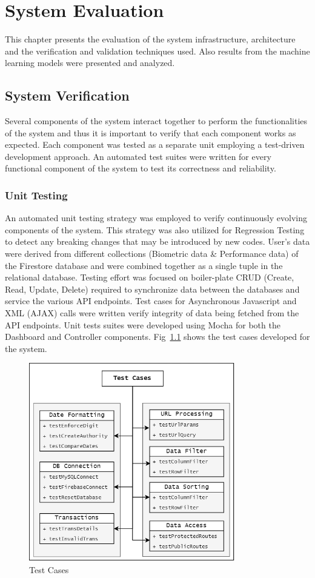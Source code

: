 \chapter{System Evaluation}
This chapter presents the evaluation of the system infrastructure, architecture and the verification and validation techniques used. Also results from the machine 
learning models were presented and analyzed. 


\section{System Verification}
Several components of the system interact together to perform the functionalities of the system and thus it is important to verify that each component works as 
expected. Each component was tested as a separate unit employing a test-driven development approach. An automated test suites were written for every functional component
of the system to test its correctness and reliability.
\subsection{Unit Testing}
An automated unit testing strategy was employed to verify continuously evolving components of the system. This strategy was also utilized for Regression Testing
to detect any breaking changes that may be introduced by new codes.
User's data were derived from different collections (Biometric data \& Performance data) of the Firestore database and were combined together as a single tuple in the 
relational database.  Testing effort was focused on boiler-plate CRUD (Create, Read, Update, Delete) required to synchronize data between the databases and service 
the various API endpoints. Test cases for Asynchronous Javascript and XML (AJAX) calls were written verify integrity of data being fetched from the API endpoints. 
Unit tests suites were developed using Mocha for both the Dashboard and Controller components. Fig~\ref{image:test_cases} shows the test cases developed for the 
system. 

\begin{figure}[H]
    \centering
    \includegraphics[width=0.8\textwidth]{images/test_cases.png}
    \caption{Test Cases}
    \label{image:test_cases}
\end{figure}

